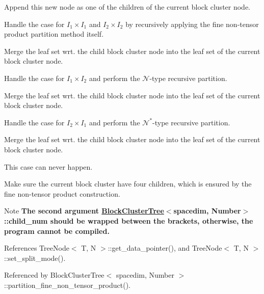 Append this new node as one of the children of the current block cluster node.

Handle the case for $I_1 \times I_1$ and $I_2 \times I_2$ by recursively applying the fine non-\/tensor product partition method itself.

Merge the leaf set wrt. the child block cluster node into the leaf set of the current block cluster node.

Handle the case for $I_1 \times I_2$ and perform the $\mathcal{N}$-\/type recursive partition.

Merge the leaf set wrt. the child block cluster node into the leaf set of the current block cluster node.

Handle the case for $I_2 \times I_1$ and perform the $\mathcal{N}^*$-\/type recursive partition.

Merge the leaf set wrt. the child block cluster node into the leaf set of the current block cluster node.

This case can never happen.

Make sure the current block cluster have four children, which is ensured by the fine non-\/tensor product construction.


\begin{DoxyDescription}
\item[Note ]{\bfseries The second argument {\ttfamily \hyperlink{classBlockClusterTree}{Block\+Cluster\+Tree}$<$spacedim}, Number$>$\+::child\+\_\+num should be wrapped between the brackets, otherwise, the program cannot be compiled.} 
\end{DoxyDescription}

References Tree\+Node$<$ T, N $>$\+::get\+\_\+data\+\_\+pointer(), and Tree\+Node$<$ T, N $>$\+::set\+\_\+split\+\_\+mode().



Referenced by Block\+Cluster\+Tree$<$ spacedim, Number $>$\+::partition\+\_\+fine\+\_\+non\+\_\+tensor\+\_\+product().

\mbox{\label{classBlockClusterTree_aafad0fae48bf7c462e8e943b76893fc0}} 
